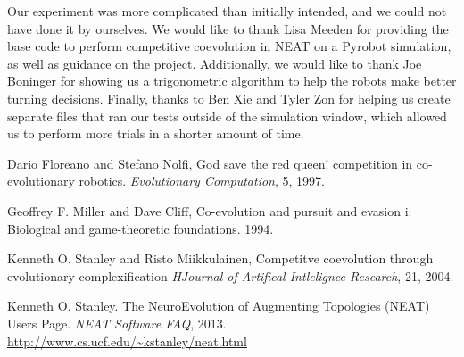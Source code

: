 \documentclass[11pt]{article}
\begin{document}
Our experiment was more complicated than initially intended, and we could not have done it by ourselves. We would like to thank Lisa Meeden for providing the base code to perform competitive coevolution in NEAT on a Pyrobot simulation, as well as guidance on the project. Additionally, we would  like to thank Joe Boninger for showing us a trigonometric algorithm to help the robots make better turning decisions. Finally, thanks to Ben Xie and Tyler Zon for helping us create separate files that ran our tests outside of the simulation window, which allowed us to perform more trials in a shorter amount of time.

\begin{thebibliography}{1}

   Dario Floreano and Stefano Nolfi, God save the red queen! competition in co-evolutionary robotics. {\em Evolutionary Computation}, 5, 1997.

    Geoffrey F. Miller and Dave Cliff, Co-evolution and pursuit and evasion i: Biological and game-theoretic foundations. 1994.

   Kenneth O. Stanley and Risto Miikkulainen, Competitve coevolution through evolutionary complexification {\em HJournal of Artifical Intlelignce Research}, 21, 2004.
  
   Kenneth O. Stanley. The NeuroEvolution of Augmenting Topologies (NEAT) Users Page. {\em NEAT Software FAQ}, 2013. \url{http://www.cs.ucf.edu/~kstanley/neat.html}


  \end{thebibliography}
\end{document}
